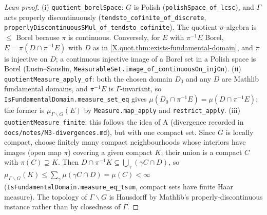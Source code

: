 \begin{proof}[Lean proof]
(i) \texttt{quotient\_borelSpace}: $G$ is Polish (\texttt{polishSpace\_of\_lcsc}), and $\Gamma$ acts properly discontinuously (\texttt{tendsto\_cofinite\_of\_discrete}, \texttt{properlyDiscontinuousSMul\_of\_tendsto\_cofinite}). The quotient $\sigma$-algebra is $\le$ Borel because $\pi$ is continuous. Conversely, for $E$ with $\pi^{-1}E$ Borel, $E=\pi(D\cap\pi^{-1}E)$ with $D$ as in \cref{X.quot.thm:exists-fundamental-domain}, and $\pi$ is injective on $D$; a continuous injective image of a Borel set in a Polish space is Borel (Lusin--Souslin, \texttt{MeasurableSet.image\_of\_continuousOn\_injOn}). (ii) \texttt{quotientMeasure\_apply\_of}: both the chosen domain $D_0$ and any $D$ are Mathlib fundamental domains, and $\pi^{-1}E$ is $\Gamma$-invariant, so \texttt{IsFundamentalDomain.measure\_set\_eq} gives $\mu(D_0\cap\pi^{-1}E)=\mu(D\cap\pi^{-1}E)$; the former is $\mu_{\Gamma\backslash G}(E)$ by \texttt{Measure.map\_apply} and \texttt{restrict\_apply}. (iii) \texttt{quotientMeasure\_finite}: this follows the idea of A (divergence recorded in \texttt{docs/notes/M3-divergences.md}), but with one compact set. Since $G$ is locally compact, choose finitely many compact neighbourhoods whose interiors have images (open map $\pi$) covering a given compact $K$; their union is a compact $C$ with $\pi(C)\supseteq K$. Then $D\cap\pi^{-1}K\subseteq\bigcup_\gamma(\gamma C\cap D)$, so $\mu_{\Gamma\backslash G}(K)\le\sum_\gamma\mu(\gamma C\cap D)=\mu(C)<\infty$ (\texttt{IsFundamentalDomain.measure\_eq\_tsum}, compact sets have finite Haar measure). The topology of $\Gamma\backslash G$ is Hausdorff by Mathlib's properly-discontinuous instance rather than by closedness of $\Gamma$.
\end{proof}

